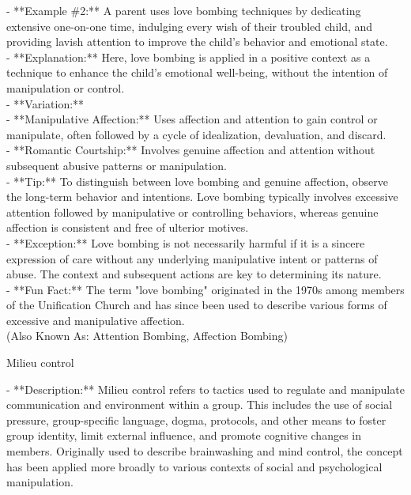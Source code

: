 \documentclass[a4paper,12pt,single,pdftex]{scrbook}
\begin{document}
{    
      - **Example \#2:** A parent uses love bombing techniques by dedicating extensive one-on-one time, indulging every wish of their troubled child, and providing lavish attention to improve the child's behavior and emotional state.
    \\

    
      - **Explanation:** Here, love bombing is applied in a positive context as a technique to enhance the child's emotional well-being, without the intention of manipulation or control.
    \\

    
      - **Variation:**
    \\

    
        - **Manipulative Affection:** Uses affection and attention to gain control or manipulate, often followed by a cycle of idealization, devaluation, and discard.
    \\

    
        - **Romantic Courtship:** Involves genuine affection and attention without subsequent abusive patterns or manipulation.
    \\

    
      - **Tip:** To distinguish between love bombing and genuine affection, observe the long-term behavior and intentions. Love bombing typically involves excessive attention followed by manipulative or controlling behaviors, whereas genuine affection is consistent and free of ulterior motives.
    \\

    
      - **Exception:** Love bombing is not necessarily harmful if it is a sincere expression of care without any underlying manipulative intent or patterns of abuse. The context and subsequent actions are key to determining its nature.
    \\

    
      - **Fun Fact:** The term "love bombing" originated in the 1970s among members of the Unification Church and has since been used to describe various forms of excessive and manipulative affection.
    \\

  
    
      (Also Known As: Attention Bombing, Affection Bombing)
    \\

  }


Milieu control
    
      - **Description:** Milieu control refers to tactics used to regulate and manipulate communication and environment within a group. This includes the use of social pressure, group-specific language, dogma, protocols, and other means to foster group identity, limit external influence, and promote cognitive changes in members. Originally used to describe brainwashing and mind control, the concept has been applied more broadly to various contexts of social and psychological manipulation.
    \\
\end{document}
